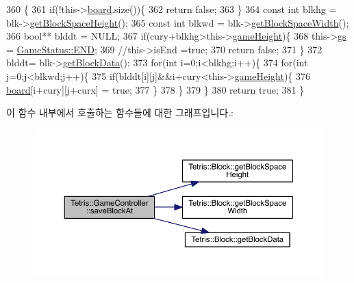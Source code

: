 \begin{DoxyCode}
360                                                                                         \{
361                 \textcolor{keywordflow}{if}(!this->\hyperlink{class_tetris_1_1_game_controller_a7725b6cec9459a6bffaa3e29dd1c5196}{board}.size())\{
362                     \textcolor{keywordflow}{return} \textcolor{keyword}{false};
363                 \}
364                 \textcolor{keyword}{const} \textcolor{keywordtype}{int} blkhg = blk->\hyperlink{class_tetris_1_1_block_a5301977e32c03aaf122fa289fcba77ba}{getBlockSpaceHeight}();
365                 \textcolor{keyword}{const} \textcolor{keywordtype}{int} blkwd = blk->\hyperlink{class_tetris_1_1_block_ac390e14de476582300d815d9054ed9bd}{getBlockSpaceWidth}();
366                  \textcolor{keywordtype}{bool}** blddt = NULL;
367                  \textcolor{keywordflow}{if}(cury+blkhg>this->\hyperlink{class_tetris_1_1_game_controller_a8e3adc647ed382de0ff541417bea9b33}{gameHeight})\{
368                      this->\hyperlink{class_tetris_1_1_game_controller_ae4c894005a82404c73a5a9a6efb208dc}{gs} = \hyperlink{class_tetris_1_1_game_controller_a96a963b56385f3b3a122ff0ca2beb770ab1a326c06d88bf042f73d70f50197905}{GameStatus::END};
369                      \textcolor{comment}{//this->isEnd =true;}
370                     \textcolor{keywordflow}{return} \textcolor{keyword}{false};
371                  \}
372                 blddt= blk->\hyperlink{class_tetris_1_1_block_a9bd2c3d6ccacff9a5f56f72336ba324f}{getBlockData}();
373                 \textcolor{keywordflow}{for}(\textcolor{keywordtype}{int} i=0;i<blkhg;i++)\{
374                     \textcolor{keywordflow}{for}(\textcolor{keywordtype}{int} j=0;j<blkwd;j++)\{
375                         \textcolor{keywordflow}{if}(blddt[i][j]&&i+cury<this->\hyperlink{class_tetris_1_1_game_controller_a8e3adc647ed382de0ff541417bea9b33}{gameHeight})\{
376                             \hyperlink{class_tetris_1_1_game_controller_a7725b6cec9459a6bffaa3e29dd1c5196}{board}[i+cury][j+curx] = \textcolor{keyword}{true};
377                         \}
378                     \}
379                 \}
380                 \textcolor{keywordflow}{return} \textcolor{keyword}{true};
381             \}
\end{DoxyCode}
이 함수 내부에서 호출하는 함수들에 대한 그래프입니다.\+:
\nopagebreak
\begin{figure}[H]
\begin{center}
\leavevmode
\includegraphics[width=350pt]{db/dd2/class_tetris_1_1_game_controller_adc067380df0f0da4ea4a358d00d6a123_cgraph}
\end{center}
\end{figure}
